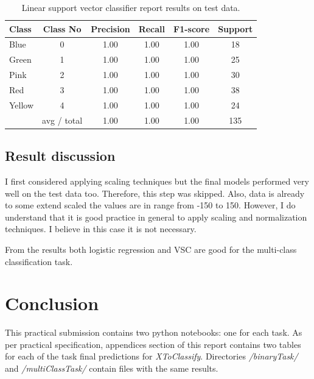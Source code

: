 \documentclass[11pt]{article}
\begin{document}
			\begin{center}
			  	\begin{table}[h]
			  	\centering
				\begin{tabular}[b]{| l | c | c | c | c | c |}
					\hline
					Class & Class No & Precision &  Recall & F1-score & Support  \\
		 			\hline
					Blue  & 0  &   1.00   &   1.00   &   1.00   &   18 \\
          			Green & 1  &   1.00   &   1.00   &   1.00   &   25 \\
         			Pink  & 2  &   1.00   &   1.00   &   1.00   &   30 \\
          			Red  & 3  &   1.00   &   1.00   &   1.00   &   38 \\
          			Yellow & 4  &   1.00   &   1.00   &   1.00   &  24 \\
          			\hline
					 & avg / total   &   1.00   &   1.00   &   1.00  &  135 \\
					\hline
				\end{tabular}
				\caption{Linear support vector classifier report results on test data.}
				\label{tbl:vector_resuts_multi_testing}
				\end{table}
			\end{center}
			\vspace*{-1.3cm}

		\subsection{Result discussion}
			I first considered applying scaling techniques but the final models performed very well on the test data too. Therefore, this step was skipped. Also, data is already to some extend scaled the values are in range from -150 to 150. However, I do understand that it is good practice in general to apply scaling and normalization techniques. I believe in this case it is not necessary. 

			From the results both logistic regression and VSC are good for the multi-class classification task. 

	\section{Conclusion}
		This practical submission contains two python notebooks: one for each task. As per practical specification, appendices section of this report contains two tables for each of the task final predictions for \textit{XToClassify}. Directories \textit{/binaryTask/} and \textit{/multiClassTask/} contain files with the same results. 
\end{document}
